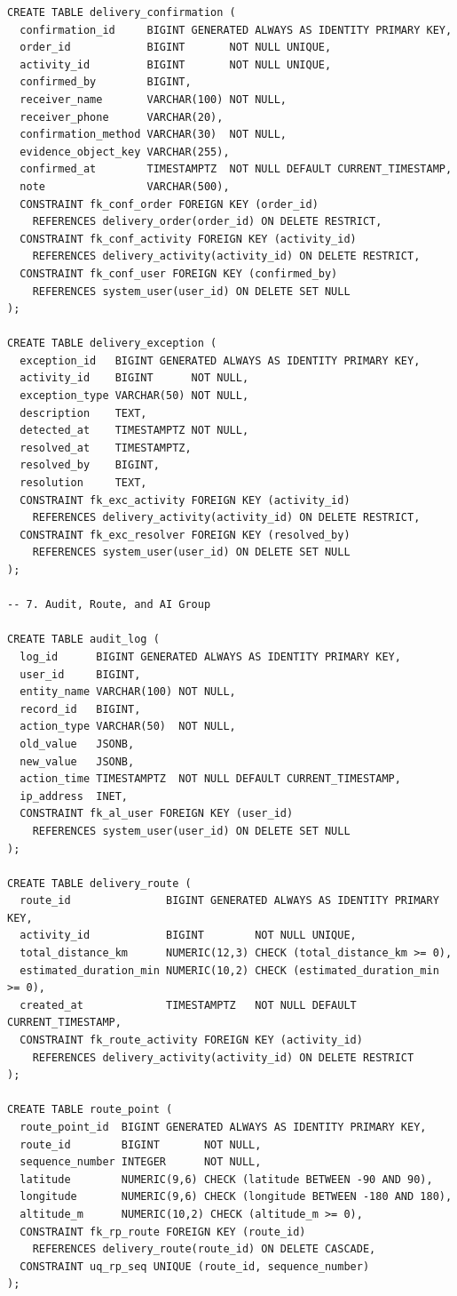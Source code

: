 \begin{verbatim}
CREATE TABLE delivery_confirmation (
  confirmation_id     BIGINT GENERATED ALWAYS AS IDENTITY PRIMARY KEY,
  order_id            BIGINT       NOT NULL UNIQUE,
  activity_id         BIGINT       NOT NULL UNIQUE,
  confirmed_by        BIGINT,
  receiver_name       VARCHAR(100) NOT NULL,
  receiver_phone      VARCHAR(20),
  confirmation_method VARCHAR(30)  NOT NULL,
  evidence_object_key VARCHAR(255),
  confirmed_at        TIMESTAMPTZ  NOT NULL DEFAULT CURRENT_TIMESTAMP,
  note                VARCHAR(500),
  CONSTRAINT fk_conf_order FOREIGN KEY (order_id)
    REFERENCES delivery_order(order_id) ON DELETE RESTRICT,
  CONSTRAINT fk_conf_activity FOREIGN KEY (activity_id)
    REFERENCES delivery_activity(activity_id) ON DELETE RESTRICT,
  CONSTRAINT fk_conf_user FOREIGN KEY (confirmed_by)
    REFERENCES system_user(user_id) ON DELETE SET NULL
);

CREATE TABLE delivery_exception (
  exception_id   BIGINT GENERATED ALWAYS AS IDENTITY PRIMARY KEY,
  activity_id    BIGINT      NOT NULL,
  exception_type VARCHAR(50) NOT NULL,
  description    TEXT,
  detected_at    TIMESTAMPTZ NOT NULL,
  resolved_at    TIMESTAMPTZ,
  resolved_by    BIGINT,
  resolution     TEXT,
  CONSTRAINT fk_exc_activity FOREIGN KEY (activity_id)
    REFERENCES delivery_activity(activity_id) ON DELETE RESTRICT,
  CONSTRAINT fk_exc_resolver FOREIGN KEY (resolved_by)
    REFERENCES system_user(user_id) ON DELETE SET NULL
);

-- 7. Audit, Route, and AI Group

CREATE TABLE audit_log (
  log_id      BIGINT GENERATED ALWAYS AS IDENTITY PRIMARY KEY,
  user_id     BIGINT,
  entity_name VARCHAR(100) NOT NULL,
  record_id   BIGINT,
  action_type VARCHAR(50)  NOT NULL,
  old_value   JSONB,
  new_value   JSONB,
  action_time TIMESTAMPTZ  NOT NULL DEFAULT CURRENT_TIMESTAMP,
  ip_address  INET,
  CONSTRAINT fk_al_user FOREIGN KEY (user_id)
    REFERENCES system_user(user_id) ON DELETE SET NULL
);

CREATE TABLE delivery_route (
  route_id               BIGINT GENERATED ALWAYS AS IDENTITY PRIMARY KEY,
  activity_id            BIGINT        NOT NULL UNIQUE,
  total_distance_km      NUMERIC(12,3) CHECK (total_distance_km >= 0),
  estimated_duration_min NUMERIC(10,2) CHECK (estimated_duration_min >= 0),
  created_at             TIMESTAMPTZ   NOT NULL DEFAULT CURRENT_TIMESTAMP,
  CONSTRAINT fk_route_activity FOREIGN KEY (activity_id)
    REFERENCES delivery_activity(activity_id) ON DELETE RESTRICT
);

CREATE TABLE route_point (
  route_point_id  BIGINT GENERATED ALWAYS AS IDENTITY PRIMARY KEY,
  route_id        BIGINT       NOT NULL,
  sequence_number INTEGER      NOT NULL,
  latitude        NUMERIC(9,6) CHECK (latitude BETWEEN -90 AND 90),
  longitude       NUMERIC(9,6) CHECK (longitude BETWEEN -180 AND 180),
  altitude_m      NUMERIC(10,2) CHECK (altitude_m >= 0),
  CONSTRAINT fk_rp_route FOREIGN KEY (route_id)
    REFERENCES delivery_route(route_id) ON DELETE CASCADE,
  CONSTRAINT uq_rp_seq UNIQUE (route_id, sequence_number)
);


\end{verbatim}
